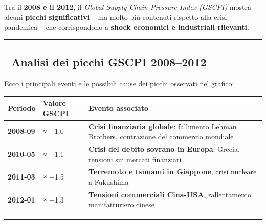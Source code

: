 \documentclass[
  11pt,
  letterpaper,
  DIV=11,
  numbers=noendperiod]{scrartcl}
\begin{document}
Tra il \textbf{2008 e il 2012}, il \emph{Global Supply Chain Pressure
Index (GSCPI)} mostra alcuni \textbf{picchi significativi} -- ma molto
più contenuti rispetto alla crisi pandemica -- che corrispondono a
\textbf{shock economici e industriali rilevanti}.

\begin{center}\rule{0.5\linewidth}{0.5pt}\end{center}

\subsection{📌 Analisi dei picchi GSCPI
2008--2012}\label{analisi-dei-picchi-gscpi-20082012}

Ecco i principali eventi e le possibili cause dei picchi osservati nel
grafico:

\begin{longtable}[]{@{}
  >{\raggedright\arraybackslash}p{}
  >{\raggedright\arraybackslash}p{}
  >{\raggedright\arraybackslash}p{}@{}}
\toprule\noalign{}
\begin{minipage}[b]{\linewidth}\raggedright
Periodo
\end{minipage} & \begin{minipage}[b]{\linewidth}\raggedright
Valore GSCPI
\end{minipage} & \begin{minipage}[b]{\linewidth}\raggedright
Evento associato
\end{minipage} \\
\midrule\noalign{}
\endhead
\bottomrule\noalign{}
\endlastfoot
\textbf{2008-09} & ≈ +1.0 & \textbf{Crisi finanziaria globale}:
fallimento Lehman Brothers, contrazione del commercio mondiale \\
\textbf{2010-05} & ≈ +1.1 & \textbf{Crisi del debito sovrano in Europa}:
Grecia, tensioni sui mercati finanziari \\
\textbf{2011-03} & ≈ +1.5 & \textbf{Terremoto e tsunami in Giappone},
crisi nucleare a Fukushima \\
\textbf{2012-01} & ≈ +1.3 & \textbf{Tensioni commerciali Cina-USA},
rallentamento manifatturiero cinese \\
\end{longtable}

\begin{center}\rule{0.5\linewidth}{0.5pt}\end{center}
\end{document}
